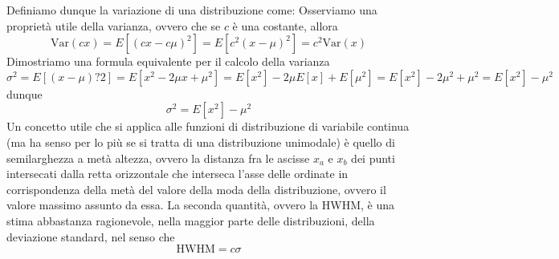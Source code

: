 \documentclass{report}
\begin{document}
Definiamo dunque la variazione di una distribuzione come:
\noindent Osserviamo una proprietà utile della varianza, ovvero che se $c$ è una costante, allora
$$
	\text{Var}(cx) = E[(cx - c\mu)^2] = E[c^2(x - \mu)^2] = c^2 \text{Var}(x) 
$$
Dimostriamo una formula equivalente per il calcolo della varianza
\begin{equation*}
	\sigma^2 = E[(x - \mu)?2] = E[x^2 - 2 \mu x + \mu^2] = E[x^2] - 2 \mu E[x] + E[\mu^2] = E[x^2] - 2 \mu^2 + \mu^2 = E[x^2] - \mu^2
\end{equation*}
dunque
\begin{equation}
	\sigma^2 = E[x^2] - \mu^2
	\label{calcolo_sigma}
\end{equation}
Un concetto utile che si applica alle funzioni di distribuzione di variabile continua (ma ha senso per lo più se si tratta di una distribuzione unimodale) è quello di semilarghezza a metà altezza, ovvero la distanza fra le ascisse $x_a$ e $x_b$ dei punti intersecati dalla retta orizzontale che interseca l'asse delle ordinate in corrispondenza della metà del valore della moda della distribuzione, ovvero il valore massimo assunto da essa. 
\noindent La seconda quantità, ovvero la HWHM, è una stima abbastanza ragionevole, nella maggior parte delle distribuzioni, della deviazione standard, nel senso che
\begin{equation}
	\text{HWHM} = c \sigma
\end{equation}
\end{document}
